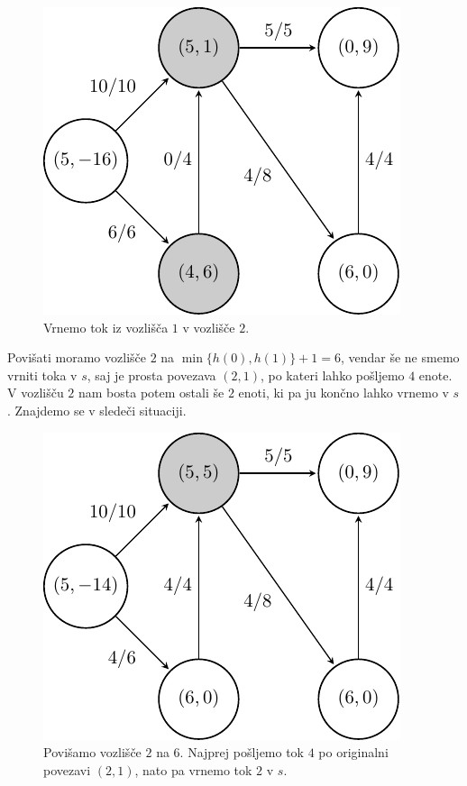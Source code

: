 \documentclass[mat1]{fmfdelo}
\begin{document}
\begin{figure}[H]
  \centering
  \includegraphics{images/graf2-14.pdf}
  \caption{Vrnemo tok iz vozlišča $1$ v vozlišče $2$.}
\end{figure}

Povišati moramo vozlišče $2$ na $\min\{h(0), h(1)\} + 1 = 6$, vendar še ne smemo vrniti toka v $s$, saj je prosta povezava $(2,1)$, po kateri
lahko pošljemo $4$ enote. V vozlišču $2$ nam bosta potem ostali še $2$ enoti, ki pa ju končno lahko vrnemo v $s$. Znajdemo se v sledeči situaciji.

\begin{figure}[H]
  \centering
  \includegraphics{images/graf2-15.pdf}
  \caption{Povišamo vozlišče $2$ na $6$. Najprej pošljemo tok $4$ po originalni povezavi $(2,1)$, nato pa vrnemo tok $2$ v $s$.}
\end{figure}
\end{document}
